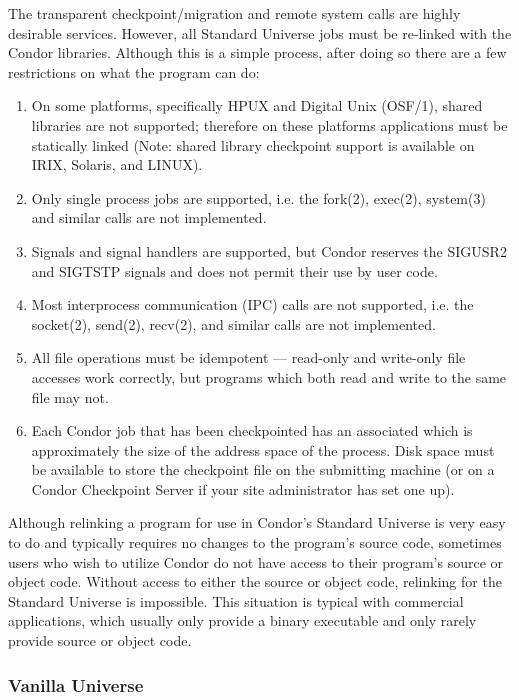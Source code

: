 The transparent checkpoint/migration and remote system calls are highly
desirable services. However, all Standard Universe jobs must be
re-linked with the Condor libraries. Although this is a simple process,
after doing so there are a few restrictions on what the program can do:
\begin{enumerate}
	\item On some platforms, specifically HPUX and Digital Unix
(OSF/1), shared libraries are not supported; therefore on these
platforms applications must be statically linked (Note: shared library
checkpoint support is available on IRIX, Solaris, and LINUX). 
	\item Only single process jobs are supported, i.e. the fork(2), exec(2),
system(3) and similar calls are not implemented.
	\item Signals and signal handlers are supported, but Condor reserves the 
SIGUSR2 and SIGTSTP signals and does not permit their use by user code.
	\item Most interprocess communication (IPC) calls are not supported, i.e. the 
socket(2), send(2), recv(2), and similar calls are not implemented.
	\item All file operations must be idempotent --- read-only and write-only file 
accesses work correctly, but programs which both read and write to the 
same file may not.
	\item Each Condor job that has been checkpointed has an associated 
 which is approximately the size of the address space of the 
process. Disk space must be available to store the checkpoint file on the 
submitting machine (or on a Condor Checkpoint Server if your site administrator
has set one up).
\end{enumerate}

Although relinking a program for use in Condor's Standard Universe is
very easy to do and typically requires no changes to the program's
source code, sometimes users who wish to utilize Condor do not have
access to their program's source or object code. Without access to
either the source or object code, relinking for the Standard Universe is
impossible. This situation is typical with commercial applications,
which usually only provide a binary executable and only rarely provide
source or object code.

\subsubsection{Vanilla Universe}

